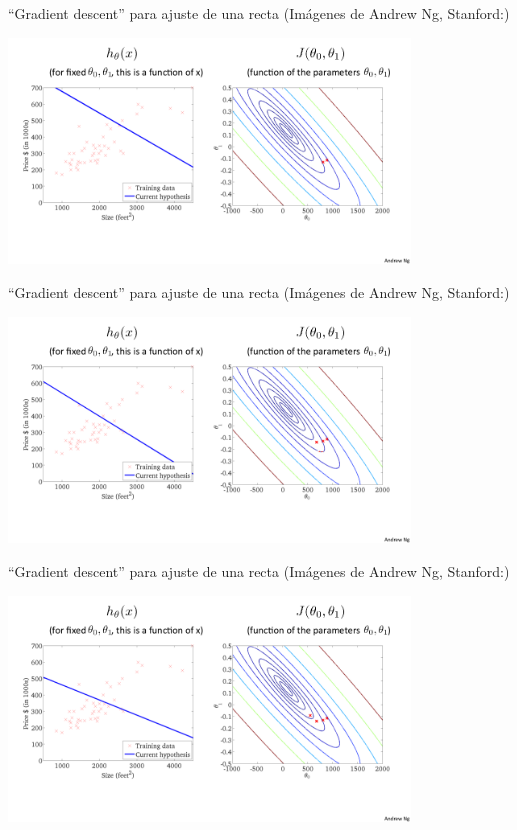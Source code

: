 \documentclass[aspectratio=169]{beamer}
\begin{document}
\begin{frame}{``Gradient descent'' para ajuste de una recta  {\scriptsize (Imágenes de Andrew Ng, Stanford:)}}

\begin{center}
  \includegraphics[height=6cm]{ng-gradient2.png}
\end{center}
\end{frame}

\begin{frame}{``Gradient descent'' para ajuste de una recta  {\scriptsize (Imágenes de Andrew Ng, Stanford:)}}

\begin{center}
  \includegraphics[height=6cm]{ng-gradient3.png}
\end{center}
\end{frame}
\begin{frame}{``Gradient descent'' para ajuste de una recta  {\scriptsize (Imágenes de Andrew Ng, Stanford:)}}

\begin{center}
  \includegraphics[height=6cm]{ng-gradient4.png}
\end{center}
\end{frame}
\end{document}
